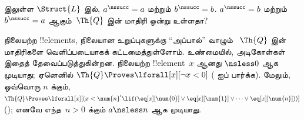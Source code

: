 \documentclass[../../../include/open-logic-section]{subfiles}
\begin{document}
\begin{prob}
 இலுள்ள $\Struct{L}$ இல்,
$a^\nssucc
= a$ மற்றும் $b^\nssucc = b$. $a^\nssucc = b$ மற்றும்
$b^\nssucc = a$ ஆகும்~$\Th{Q}$ இன் மாதிரி ஒன்று உள்ளதா?
\end{prob}

\begin{explain}
நிலையற்ற !!{element}s, நிலையான உறுப்புகளுக்கு ``அப்பால்'' வாழும்
~$\Th{Q}$ இன் மாதிரிகளை வெளிப்படையாகக் கட்டமைத்துள்ளோம். உண்மையில்,
அடிகோள்கள் இதைத் தேவைப்படுத்துகின்றன. நிலையற்ற !!{element}~$x$
ஆனது ${} \nsless 0$ ஆக முடியாது; ஏனெனில்
$\Th{Q} \Proves
\lforall[x][\lnot x<0]$ ( ஐப்
பார்க்க). மேலும், ஒவ்வொரு $n$ க்கும்,
$\Th{Q} \Proves \lforall[x][(x < \num{n}' \lif
(\eq[x][\num{0}] \lor \eq[x][\num{1}] \lor \dots \lor
\eq[x][\num{n}]))]$ (); எனவே
எந்த~$n>0$ க்கும் $a \nsless n$ ஆக முடியாது.
\end{explain}
\end{document}

